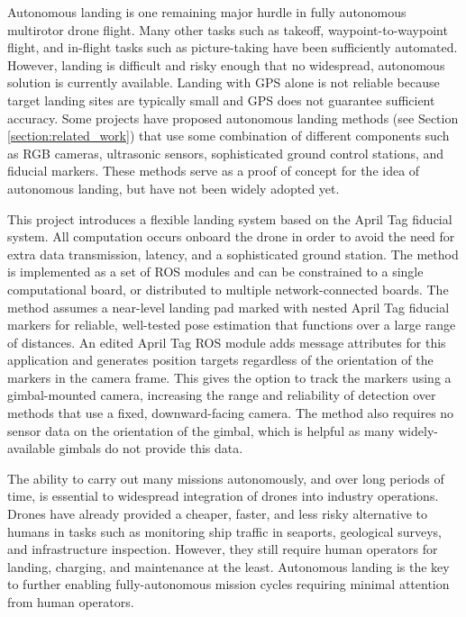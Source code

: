 Autonomous landing is one remaining major hurdle in fully autonomous multirotor drone flight.
Many other tasks such as takeoff, waypoint-to-waypoint flight, and in-flight tasks such as picture-taking have been
sufficiently automated.
However, landing is difficult and risky enough that no widespread, autonomous solution is currently available.
Landing with GPS alone is not reliable because target landing sites are typically small and GPS does not guarantee sufficient accuracy.
Some projects have proposed autonomous landing methods (see Section \ref{section:related_work})
that use some combination of different components such as RGB cameras, ultrasonic sensors,
sophisticated ground control stations, and fiducial markers.
These methods serve as a proof of concept for the idea of autonomous landing, but have not been widely adopted yet.

This project introduces a flexible landing system based on the April Tag\cite{apriltag3_paper} fiducial system.
All computation occurs onboard the drone in order to avoid the need for extra data transmission, latency, and a
sophisticated ground station.
The method is implemented as a set of ROS modules and can be constrained to a single computational board,
or distributed to multiple network-connected boards.
The method assumes a near-level landing pad marked with nested April Tag fiducial markers for reliable, well-tested
pose estimation that functions over a large range of distances.
An edited April Tag ROS module adds message attributes for this application and generates position targets
regardless of the orientation of the markers in the camera frame.
This gives the option to track the markers using a gimbal-mounted camera,
increasing the range and reliability of detection over methods that use a fixed, downward-facing camera.
The method also requires no sensor data on the orientation of the gimbal, which is helpful as many widely-available
gimbals do not provide this data.

The ability to carry out many missions autonomously, and over long periods of time,
is essential to widespread integration of drones into industry operations.
Drones have already provided a cheaper, faster, and less risky alternative to humans in tasks such as
monitoring ship traffic in seaports\cite{security_integration},
geological surveys\cite{eit},
and infrastructure inspection.\cite{maritine_infrastructure_inspection}
However, they still require human operators for landing, charging, and maintenance at the least.
Autonomous landing is the key to further enabling fully-autonomous mission cycles requiring minimal attention from human operators.